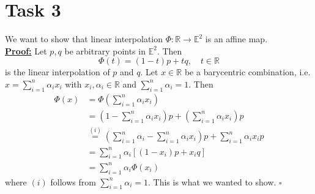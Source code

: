\documentclass[]{article}
\begin{document}
\newpage
\section*{Task 3}
We want to show that linear interpolation $\Phi : \mathbb{R} \rightarrow \mathbb{E}^2$ is an affine map.\\
\underline{\textbf{Proof:}} Let $p,q$ be arbitrary points in $\mathbb{E}^2$. Then \begin{equation*}
\Phi (t) = (1-t)p + tq, \quad t\in \mathbb{R}
\end{equation*}
is the linear interpolation of $p$ and $q$. Let $x\in \mathbb{R}$ be a barycentric combination, i.e. $x=\sum_{i=1}^{n}\alpha_i x_i$ with $x_i, \alpha_i\in \mathbb{R}$ and $\sum_{i=1}^{n}\alpha_i = 1$. Then \begin{equation*}
\begin{aligned}
\Phi (x) &= \Phi (\sum_{i=1}^{n}\alpha_i x_i)\\
&=(1-\sum_{i=1}^{n}\alpha_i x_i)p + (\sum_{i=1}^{n}\alpha_i x_i)p\\
&\overset{(i)}{=}(\sum_{i=1}^{n}\alpha_i-\sum_{i=1}^{n}\alpha_i x_i)p + \sum_{i=1}^{n}\alpha_i x_ip\\
&=\sum_{i=1}^{n}\alpha_i[(1-x_i)p + x_iq]\\
&=\sum_{i=1}^{n}\alpha_i\Phi(x_i)
\end{aligned}
\end{equation*}
where $(i)$ follows from $\sum_{i=1}^{n}\alpha_i=1$. This is what we wanted to show. $\square$\\

\newpage
\end{document}
